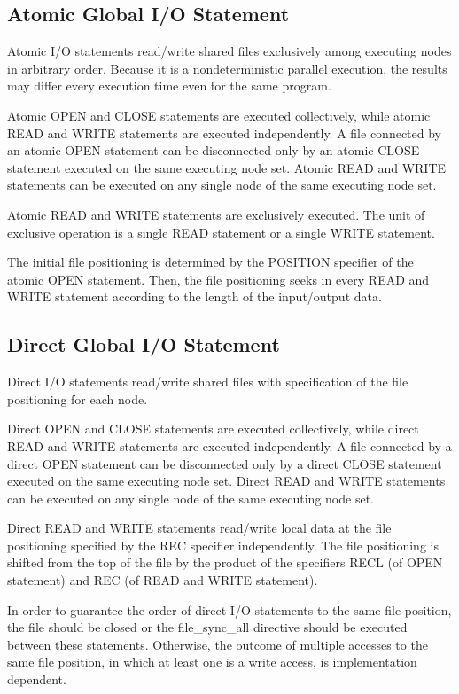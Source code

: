    \subsection{Atomic Global I/O Statement}

   Atomic I/O statements read/write shared files exclusively among executing nodes
   in arbitrary order.
   Because it is a nondeterministic parallel execution,
   the results may differ every execution time even for the same program.

   Atomic OPEN and CLOSE statements are executed collectively, while atomic
   READ and WRITE statements are executed independently.
   A file connected by an atomic OPEN statement can be disconnected only by an
   atomic CLOSE statement executed on the same executing node set.
   Atomic READ and WRITE statements can be executed on any single node of the
   same executing node set.

   Atomic READ and WRITE statements are exclusively executed.
   The unit of exclusive operation is a single READ statement or a single WRITE
   statement.

   The initial file positioning is determined by the POSITION specifier of
   the atomic OPEN statement.
   Then, the file positioning seeks in every READ and WRITE statement 
   according to the length of the input/output data.


   \subsection{Direct Global I/O Statement}

   Direct I/O statements read/write shared files with specification of the
   file positioning for each node.

   Direct OPEN and CLOSE statements are executed collectively, while direct
   READ and WRITE statements are executed independently.
   A file connected by a direct OPEN statement can be disconnected only by a
   direct CLOSE statement executed on the same executing node set.
   Direct READ and WRITE statements can be executed on any single node of the
   same executing node set.
   
   Direct READ and WRITE statements read/write local data at the file positioning
   specified by the REC specifier independently.
   The file positioning is shifted from the top of the file by the product 
   of the specifiers RECL (of OPEN statement) and
   REC (of READ and WRITE statement). 

   In order to guarantee the order of direct I/O statements to the same
   file position, the file should be closed or the file\_sync\_all
   directive should be executed between these statements. Otherwise, the
   outcome of multiple accesses to the same file position, in which at
   least one is a write access, is implementation dependent.

